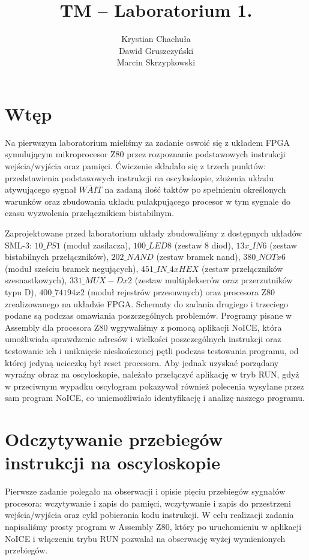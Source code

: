 \documentclass[fleqn]{article}
\title{TM -- Laboratorium 1.}
\author{Krystian Chachuła \\ Dawid Gruszczyński \\ Marcin Skrzypkowski}
\begin{document}
\maketitle

\setcounter{page}{0}
\thispagestyle{empty}

\pagebreak

\setcounter{page}{1}

\section{Wtęp}

Na pierwszym laboratorium mieliśmy za zadanie oswoić się z układem FPGA symulującym mikroprocesor Z80 przez rozpoznanie podstawowych instrukcji wejścia/wyjścia oraz pamięci. Ćwiczenie składało się z trzech punktów: przedstawienia podstawowych instrukcji na oscyloskopie, złożenia układu atywującego sygnał $\overline{WAIT}$ na zadaną ilość taktów po spełnieniu określonych warunków oraz zbudowania układu pułakpującego procesor w tym sygnale do czasu wyzwolenia przełącznikiem bistabilnym.

Zaprojektowane przed laboratorium układy zbudowaliśmy z dostępnych układów SML-3: ${10\_PS1}$ (moduł zasilacza), ${100\_LED8}$ (zestaw 8 diod), ${13x\_IN6}$ (zestaw bistabilnych przełączników), ${202\_NAND}$ (zestaw bramek nand), ${380\_NOTx6}$ (moduł sześciu bramek negujących), ${451\_IN\_4xHEX}$ (zestaw przełączników szesnastkowych), ${331\_MUX-Dx2}$ (zestaw multiplekserów oraz przerzutników typu D), ${400\_74194x2}$ (moduł rejestrów przesuwnych) oraz procesora Z80 zrealizowanego na układzie FPGA.
Schematy do zadania drugiego i trzeciego podane są podczas omawiania poszczególnych problemów. Programy pisane w Assembly dla procesora Z80 wgrywaliśmy z pomocą aplikacji NoICE, która umożliwiała sprawdzenie adresów i wielkości poszczególnych instrukcji oraz testowanie ich i uniknięcie nieskończonej pętli podczas testowania programu, od której jedyną ucieczką był reset procesora. Aby jednak uzyskać porządany wyraźny obraz na oscyloskopie, należało przełączyć aplikację w tryb RUN, gdyż w przeciwnym wypadku oscylogram pokazywał również polecenia wysyłane przez sam program NoICE, co uniemożliwiało identyfikację i analizę naszego programu.



\section{Odczytywanie przebiegów instrukcji na oscyloskopie}
Pierwsze zadanie polegało na obserwacji i opisie pięciu przebiegów sygnałów procesora: wczytywanie i zapis do pamięci, wczytywanie i zapis do przestrzeni wejścia/wyjścia oraz cykl pobierania kodu instrukcji.
W celu realizacji zadania napisaliśmy prosty program w Assembly Z80, który po uruchomieniu w aplikacji NoICE i włączeniu trybu RUN pozwalał na obserwację wyżej wymienionych przebiegów.
\end{document}
